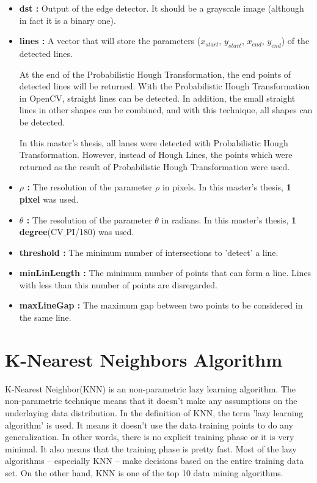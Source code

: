 \begin{itemize}

\item \textbf{dst : }Output of the edge detector. It should be a grayscale image (although in fact it is a binary one).
 
\item \textbf{lines : }A vector that will store the parameters ($ x_{start} $, $ y_{start} $, $ x_{end} $, $ y_{end} $) of the detected lines.

At the end of the Probabilistic Hough Transformation, the end points of detected lines will be returned. With the Probabilistic Hough Transformation in OpenCV, straight lines can be detected. In addition, the small straight lines in other shapes can be combined, and with this technique, all shapes can be detected.  

In this master's thesis, all lanes were detected with Probabilistic Hough Transformation. However, instead of Hough Lines, the points which were returned as the result of Probabilistic Hough Transformation were used.

\item \textbf{$ \rho $ : }The resolution of the parameter $ \rho $ in pixels. In this master's thesis, \textbf{1 pixel} was used.

\item \textbf{$ \theta $ : }The resolution of the parameter $ \theta $ in radians. In this master's thesis, \textbf{1 degree}(CV$ \_ $PI/180) was used.

\item \textbf{threshold : }The minimum number of intersections to 'detect' a line.

\item \textbf{minLinLength : }The minimum number of points that can form a line. Lines with less than this number of points are disregarded.

\item \textbf{maxLineGap : }The maximum gap between two points to be considered in the same line.

\end{itemize}



%
\section{K-Nearest Neighbors Algorithm}\label{sec:K-Nearest Neighbors Algorithm}
%
K-Nearest Neighbor(KNN) is an non-parametric lazy learning algorithm. The non-parametric technique means that it doesn't make any assumptions on the underlaying data distribution. In the definition of KNN, the term 'lazy learning algorithm' is used. It means it doesn't use the data training points to do any generalization. In other words, there is no explicit training phase or it is very minimal.  It also means that the training phase is pretty fast. Most of the lazy algorithms -- especially KNN -- make decisions based on the entire training data set. On the other hand, KNN is one of the top 10 data mining algorithms\cite{k_nearest_neighbors}.

